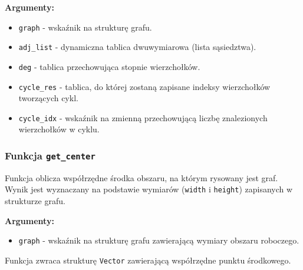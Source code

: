 \documentclass[]{article}
\begin{document}
\textbf{Argumenty:}
\begin{itemize}
\item \texttt{graph} - wskaźnik na strukturę grafu.
\item \texttt{adj\_list} - dynamiczna tablica dwuwymiarowa (lista sąsiedztwa).
\item \texttt{deg} - tablica przechowująca stopnie wierzchołków.
\item \texttt{cycle\_res} - tablica, do której zostaną zapisane indeksy wierzchołków tworzących cykl.
\item \texttt{cycle\_idx} - wskaźnik na zmienną przechowującą liczbę znalezionych wierzchołków w cyklu.
\end{itemize}


\subsubsection{Funkcja \texttt{get\_center}}

Funkcja oblicza współrzędne środka obszaru, na którym rysowany jest graf. Wynik jest wyznaczany na podstawie wymiarów (\texttt{width} i \texttt{height}) zapisanych w strukturze grafu.

\textbf{Argumenty:}
\begin{itemize}
\item \texttt{graph} - wskaźnik na strukturę grafu zawierającą wymiary obszaru roboczego.
\end{itemize}
Funkcja zwraca strukturę \texttt{Vector} zawierającą współrzędne punktu środkowego.
\end{document}
